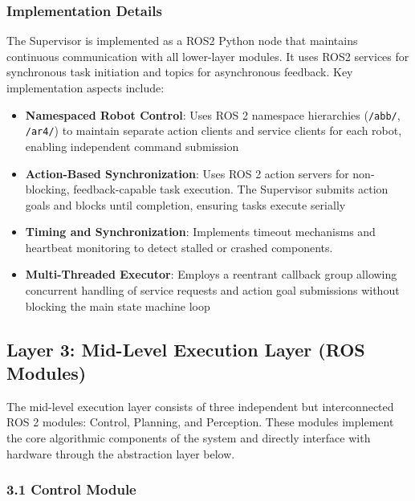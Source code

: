 \subsubsection{Implementation Details}
The Supervisor is implemented as a ROS2 Python node that maintains continuous communication with all lower-layer modules. It uses ROS2 services for synchronous task initiation and topics for asynchronous feedback. Key implementation aspects include:

\begin{itemize}
    \item \textbf{Namespaced Robot Control}: Uses ROS 2 namespace hierarchies (\texttt{/abb/}, \texttt{/ar4/}) to maintain separate action clients and service clients for each robot, enabling independent command submission
        
    \item \textbf{Action-Based Synchronization}: Uses ROS 2 action servers for non-blocking, feedback-capable task execution. The Supervisor submits action goals and blocks until completion, ensuring tasks execute serially
    
    \item \textbf{Timing and Synchronization}: Implements timeout mechanisms and heartbeat monitoring to detect stalled or crashed components.
    
    \item \textbf{Multi-Threaded Executor}: Employs a reentrant callback group allowing concurrent handling of service requests and action goal submissions without blocking the main state machine loop
\end{itemize}

\subsection{Layer 3: Mid-Level Execution Layer (ROS Modules)}
\label{subsec:ros_layer}

The mid-level execution layer consists of three independent but interconnected ROS 2 modules: Control, Planning, and Perception. These modules implement the core algorithmic components of the system and directly interface with hardware through the abstraction layer below.

\subsubsection{3.1 Control Module}
\label{subsubsec:control_module}

